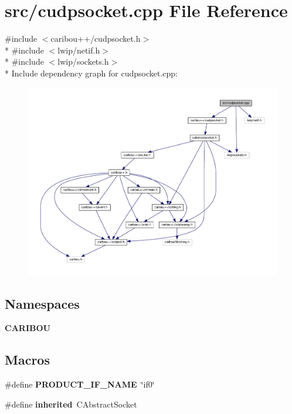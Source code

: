 \section{src/cudpsocket.cpp File Reference}
\label{cudpsocket_8cpp}
{\ttfamily \#include $<$caribou++/cudpsocket.\-h$>$}\\*
{\ttfamily \#include $<$lwip/netif.\-h$>$}\\*
{\ttfamily \#include $<$lwip/sockets.\-h$>$}\\*
Include dependency graph for cudpsocket.\-cpp\-:\nopagebreak
\begin{figure}[H]
\begin{center}
\leavevmode
\includegraphics[width=350pt]{cudpsocket_8cpp__incl}
\end{center}
\end{figure}
\subsection*{Namespaces}
\begin{DoxyCompactItemize}
\item 
{\bf C\-A\-R\-I\-B\-O\-U}
\end{DoxyCompactItemize}
\subsection*{Macros}
\begin{DoxyCompactItemize}
\item 
\#define {\bf P\-R\-O\-D\-U\-C\-T\-\_\-\-I\-F\-\_\-\-N\-A\-M\-E}~\char`\"{}if0\char`\"{}
\item 
\#define {\bf inherited}~C\-Abstract\-Socket
\end{DoxyCompactItemize}


